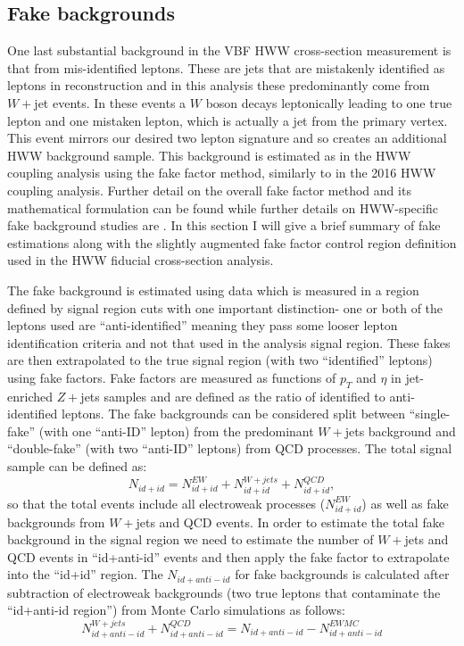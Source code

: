\subsection{Fake backgrounds}
One last substantial background in the VBF HWW cross-section measurement is that from mis-identified leptons. These are jets that are mistakenly identified as leptons in reconstruction and in this analysis these predominantly come from $W+$jet events. In these events a $W$ boson decays leptonically leading to one true lepton and one mistaken lepton, which is actually a jet from the primary vertex. This event mirrors our desired two lepton signature and so creates an additional HWW background sample. This background is estimated as in the HWW coupling analysis using the fake factor method, similarly to in the 2016 HWW coupling analysis. Further detail on the overall fake factor method and its mathematical formulation can be found \cite{fakefactormethod} while further details on HWW-specific fake background studies are \cite{Aaboud_2019}. In this section I will give a brief summary of fake estimations along with the slightly augmented fake factor control region definition used in the HWW fiducial cross-section analysis. 

The fake background is estimated using data which is measured in a region defined by signal region cuts with one important distinction- one or both of the leptons used are ``anti-identified'' meaning they pass some looser lepton identification criteria and not that used in the analysis signal region. These fakes are then extrapolated to the true signal region (with two ``identified'' leptons) using fake factors. Fake factors are measured as functions of $p_T$ and $\eta$ in jet-enriched $Z+$jets samples and are defined as the ratio of identified to anti-identified leptons. The fake backgrounds can be considered split between ``single-fake'' (with one ``anti-ID'' lepton) from the predominant $W+$jets background and ``double-fake'' (with two ``anti-ID'' leptons) from QCD processes. The total signal sample can be defined as: 
\begin{equation}
N_{id+id} = N^{EW}_{id+id}+N^{W+jets}_{id+id}+N^{QCD}_{id+id},
\end{equation} 
so that the total events include all electroweak processes ($N^{EW}_{id+id}$) as well as fake backgrounds from $W+$jets and QCD events. In order to estimate the total fake background in the signal region we need to estimate the number of $W+$jets and QCD events in ``id+anti-id'' events and then apply the fake factor to extrapolate into the ``id+id'' region. The $N_{id+anti-id}$ for fake backgrounds is calculated after subtraction of electroweak backgrounds (two true leptons that contaminate the ``id+anti-id region'') from Monte Carlo simulations as follows:
\begin{equation}
N^{W+jets}_{id+anti-id}+N^{QCD}_{id+anti-id}=N_{id+anti-id}-N^{EW MC}_{id+anti-id}
\end{equation}
 
